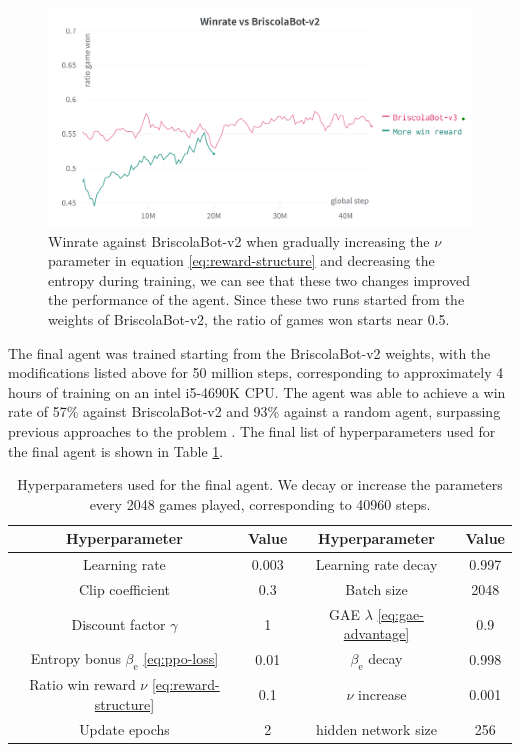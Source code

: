 \begin{figure}[H]
    \centering
    \includegraphics[width=\textwidth]{images/briscolabot-v3.png}
    \caption{Winrate against BriscolaBot-v2 when gradually increasing the $\nu$ parameter in equation \eqref{eq:reward-structure} and decreasing the entropy during training, we can see that these two changes improved the performance of the agent. Since these two runs started from the weights of BriscolaBot-v2, the ratio of games won starts near 0.5.}
    \label{fig:briscolabot-v3}
\end{figure}

The final agent was trained starting from the BriscolaBot-v2 weights, with the modifications listed above for 50 million steps, corresponding to approximately 4 hours of training on an intel i5-4690K CPU. The agent was able to achieve a win rate of 57\% against BriscolaBot-v2 and 93\% against a random agent, surpassing previous approaches to the problem \cite{alsora-deep-briscola-dqn}. The final list of hyperparameters used for the final agent is shown in Table \ref{tab:hyperparam-final}.

\begin{table}[H]
    \centering
    \begin{tabular}{cccc}
        \hline
        Hyperparameter & Value & Hyperparameter & Value \\
        \hline
        Learning rate & 0.003 & Learning rate decay & 0.997 \\
        Clip coefficient & 0.3 & Batch size & 2048 \\
        Discount factor $\gamma$ & 1 & GAE $\lambda$ \eqref{eq:gae-advantage} & 0.9 \\
        Entropy bonus $\beta_\textrm{e}$ \eqref{eq:ppo-loss} & 0.01 & $\beta_\textrm{e}$ decay & 0.998 \\
        Ratio win reward $\nu$ \eqref{eq:reward-structure} & 0.1 & $\nu$ increase & 0.001 \\
        Update epochs & 2 & hidden network size & 256
    \end{tabular}
    \caption{Hyperparameters used for the final agent. We decay or increase the parameters every 2048 games played, corresponding to 40960 steps.}
    \label{tab:hyperparam-final}
\end{table}

